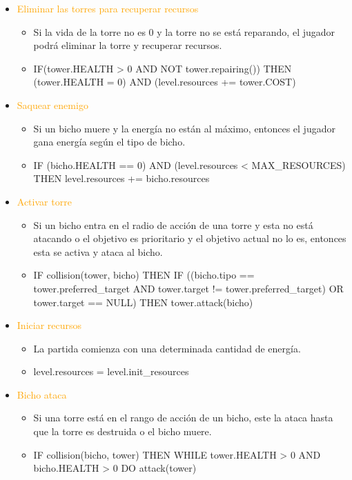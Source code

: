\documentclass{article}
\begin{document}
\begin{itemize}
\begin{itemize}
    \end{itemize}
    \clearpage
    \item \textcolor{Orange}{Eliminar las torres para recuperar recursos}
    \begin{itemize}
        \item Si la vida de la torre no es 0 y la torre no se está reparando, el jugador podrá eliminar la torre y recuperar recursos.
        \item IF(tower.HEALTH > 0 AND NOT tower.repairing()) THEN (tower.HEALTH = 0) AND \break (level.resources += tower.COST)
    \end{itemize}
    \item \textcolor{Orange}{Saquear enemigo}
    \begin{itemize}
        \item Si un bicho muere y la energía no están al máximo, entonces el jugador gana energía según el tipo de bicho.
        \item IF (bicho.HEALTH == 0) AND (level.resources < MAX\_RESOURCES) THEN \break level.resources += bicho.resources
    \end{itemize}
    \item \textcolor{Orange}{Activar torre}
    \begin{itemize}
        \item Si un bicho entra en el radio de acción de una torre y esta no está atacando o el objetivo es prioritario y el objetivo actual no lo es, entonces esta se activa y ataca al bicho.
        \item IF collision(tower, bicho) THEN IF ((bicho.tipo == tower.preferred\_target AND \break tower.target != tower.preferred\_target) OR tower.target == NULL) THEN \break tower.attack(bicho)
    \end{itemize}
    \item \textcolor{Orange}{Iniciar recursos}
    \begin{itemize}
        \item La partida comienza con una determinada cantidad de energía.
        \item level.resources = level.init\_resources
    \end{itemize}
    \item \textcolor{Orange}{Bicho ataca}
    \begin{itemize}
        \item Si una torre está en el rango de acción de un bicho, este la ataca hasta que la torre es destruida o el bicho muere.
        \item IF collision(bicho, tower) THEN WHILE tower.HEALTH > 0 AND bicho.HEALTH > 0 \break DO attack(tower)

    \end{itemize}
\end{itemize}

\end{document}
